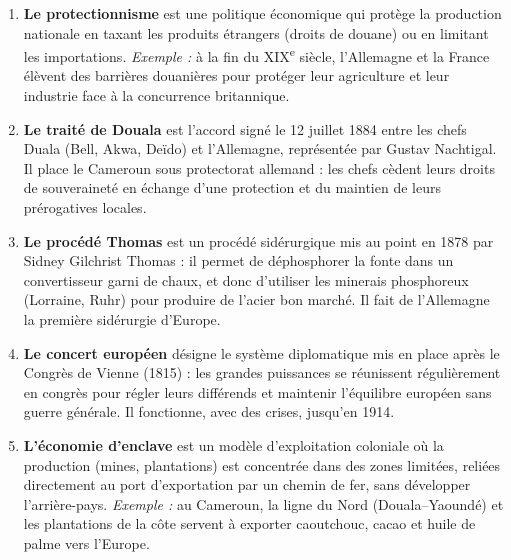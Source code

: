 \documentclass[11pt]{article}
\begin{document}
\begin{corrige}
\begin{enumerate}
\item \textbf{Le protectionnisme} est une politique économique qui protège la production nationale en taxant les produits étrangers (droits de douane) ou en limitant les importations. \emph{Exemple :} à la fin du XIX\textsuperscript{e} siècle, l'Allemagne et la France élèvent des barrières douanières pour protéger leur agriculture et leur industrie face à la concurrence britannique.
\item \textbf{Le traité de Douala} est l'accord signé le 12 juillet 1884 entre les chefs Duala (Bell, Akwa, Deïdo) et l'Allemagne, représentée par Gustav Nachtigal. Il place le Cameroun sous protectorat allemand : les chefs cèdent leurs droits de souveraineté en échange d'une protection et du maintien de leurs prérogatives locales.
\item \textbf{Le procédé Thomas} est un procédé sidérurgique mis au point en 1878 par Sidney Gilchrist Thomas : il permet de déphosphorer la fonte dans un convertisseur garni de chaux, et donc d'utiliser les minerais phosphoreux (Lorraine, Ruhr) pour produire de l'acier bon marché. Il fait de l'Allemagne la première sidérurgie d'Europe.
\item \textbf{Le concert européen} désigne le système diplomatique mis en place après le Congrès de Vienne (1815) : les grandes puissances se réunissent régulièrement en congrès pour régler leurs différends et maintenir l'équilibre européen sans guerre générale. Il fonctionne, avec des crises, jusqu'en 1914.
\item \textbf{L'économie d'enclave} est un modèle d'exploitation coloniale où la production (mines, plantations) est concentrée dans des zones limitées, reliées directement au port d'exportation par un chemin de fer, sans développer l'arrière-pays. \emph{Exemple :} au Cameroun, la ligne du Nord (Douala--Yaoundé) et les plantations de la côte servent à exporter caoutchouc, cacao et huile de palme vers l'Europe.
\end{enumerate}
\end{corrige}
\end{document}
